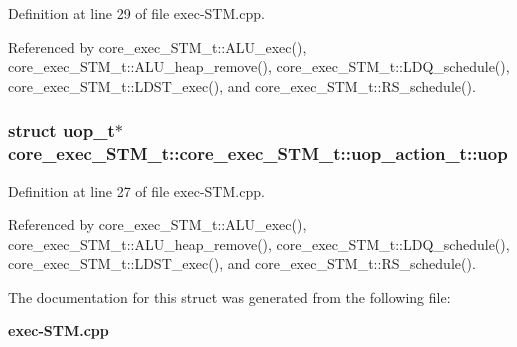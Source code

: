 Definition at line 29 of file exec-STM.cpp.

Referenced by core\_\-exec\_\-STM\_\-t::ALU\_\-exec(), core\_\-exec\_\-STM\_\-t::ALU\_\-heap\_\-remove(), core\_\-exec\_\-STM\_\-t::LDQ\_\-schedule(), core\_\-exec\_\-STM\_\-t::LDST\_\-exec(), and core\_\-exec\_\-STM\_\-t::RS\_\-schedule().
\subsubsection[{uop}]{\setlength{\rightskip}{0pt plus 5cm}struct {\bf uop\_\-t}$\ast$ core\_\-exec\_\-STM\_\-t::core\_\-exec\_\-STM\_\-t::uop\_\-action\_\-t::uop\hspace{0.3cm}{\tt  [read]}}\label{structcore__exec__STM__t_1_1uop__action__t_f0baf74db52032fa8c77d867073a4376}




Definition at line 27 of file exec-STM.cpp.

Referenced by core\_\-exec\_\-STM\_\-t::ALU\_\-exec(), core\_\-exec\_\-STM\_\-t::ALU\_\-heap\_\-remove(), core\_\-exec\_\-STM\_\-t::LDQ\_\-schedule(), core\_\-exec\_\-STM\_\-t::LDST\_\-exec(), and core\_\-exec\_\-STM\_\-t::RS\_\-schedule().

The documentation for this struct was generated from the following file:\begin{CompactItemize}
\item 
{\bf exec-STM.cpp}\end{CompactItemize}
